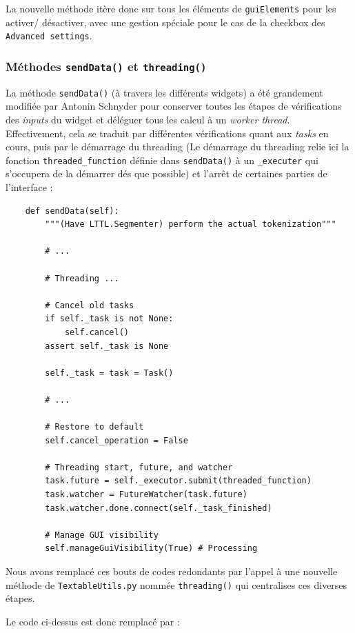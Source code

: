 \documentclass{article}
\begin{document}
La nouvelle méthode itère donc sur tous les éléments de \texttt{guiElements} pour les activer/ désactiver, avec une gestion spéciale pour le cas de la checkbox des \texttt{Advanced settings}.

\subsubsection{Méthodes \texttt{sendData()} et \texttt{threading()}}

La méthode \texttt{sendData()} (à travers les différents widgets) a été grandement modifiée par Antonin Schnyder pour conserver toutes les étapes de vérifications des \textit{inputs} du widget et déléguer tous les calcul à un \textit{worker thread}. Effectivement, cela se traduit par différentes vérifications quant aux \textit{tasks} en cours, puis par le démarrage du threading (Le démarrage du threading relie ici la fonction \texttt{threaded\_function} définie dans \texttt{sendData()} à un \texttt{\_executer} qui s'occupera de la démarrer dés que possible) et l'arrêt de certaines parties de l'interface : 

\begin{verbatim}
    def sendData(self):
        """(Have LTTL.Segmenter) perform the actual tokenization"""

        # ...

        # Threading ...
        
        # Cancel old tasks
        if self._task is not None:
            self.cancel()
        assert self._task is None

        self._task = task = Task()
        
        # ...

        # Restore to default
        self.cancel_operation = False

        # Threading start, future, and watcher
        task.future = self._executor.submit(threaded_function)
        task.watcher = FutureWatcher(task.future)
        task.watcher.done.connect(self._task_finished)

        # Manage GUI visibility
        self.manageGuiVisibility(True) # Processing
\end{verbatim}

Nous avons remplacé ces bouts de codes redondants par l'appel à une nouvelle méthode de \texttt{TextableUtils.py} nommée \texttt{threading()} qui centralises ces diverses étapes.

Le code ci-dessus est donc remplacé par : 
\end{document}
